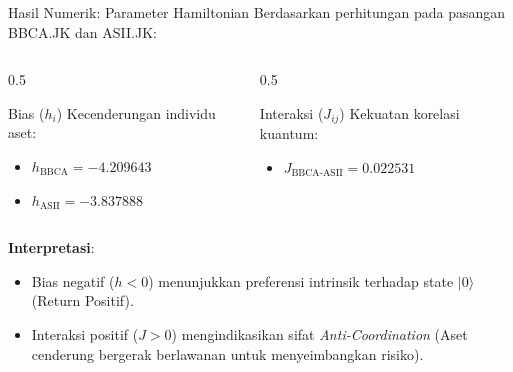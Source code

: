 \documentclass{beamer}
\begin{document}
\begin{frame}{Hasil Numerik: Parameter Hamiltonian}
    Berdasarkan perhitungan pada pasangan BBCA.JK dan ASII.JK:
    
    \begin{columns}
        \begin{column}{0.5\textwidth}
            \begin{block}{Bias ($h_i$)}
                Kecenderungan individu aset:
                \begin{itemize}
                    \item $h_{\text{BBCA}} = -4.209643$
                    \item $h_{\text{ASII}} = -3.837888$
                \end{itemize}
            \end{block}
        \end{column}
        \begin{column}{0.5\textwidth}
            \begin{block}{Interaksi ($J_{ij}$)}
                Kekuatan korelasi kuantum:
                \begin{itemize}
                    \item $J_{\text{BBCA-ASII}} = 0.022531$
                \end{itemize}
            \end{block}
        \end{column}
    \end{columns}
    
    \vspace{0.5cm}
    \textbf{Interpretasi}:
    \begin{itemize}
        \item Bias negatif ($h < 0$) menunjukkan preferensi intrinsik terhadap state $|0\rangle$ (Return Positif).
        \item Interaksi positif ($J > 0$) mengindikasikan sifat \textit{Anti-Coordination} (Aset cenderung bergerak berlawanan untuk menyeimbangkan risiko).
    \end{itemize}
\end{frame}
\end{document}
